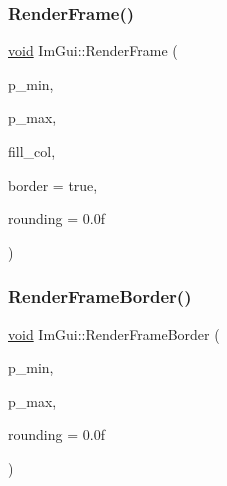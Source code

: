 \mbox{\label{namespaceImGui_a621ba649568ede3939d4f10d83b86d04}} 
\subsubsection{\texorpdfstring{Render\+Frame()}{RenderFrame()}}
{\footnotesize\ttfamily \hyperlink{imgui__impl__opengl3__loader_8h_ac668e7cffd9e2e9cfee428b9b2f34fa7}{void} Im\+Gui\+::\+Render\+Frame (\begin{DoxyParamCaption}\item[{\hyperlink{structImVec2}{Im\+Vec2}}]{p\+\_\+min,  }\item[{\hyperlink{structImVec2}{Im\+Vec2}}]{p\+\_\+max,  }\item[{Im\+U32}]{fill\+\_\+col,  }\item[{bool}]{border = {\ttfamily true},  }\item[{float}]{rounding = {\ttfamily 0.0f} }\end{DoxyParamCaption})}

\mbox{\label{namespaceImGui_adc76239c2006e66f8dab7638529a763d}} 
\subsubsection{\texorpdfstring{Render\+Frame\+Border()}{RenderFrameBorder()}}
{\footnotesize\ttfamily \hyperlink{imgui__impl__opengl3__loader_8h_ac668e7cffd9e2e9cfee428b9b2f34fa7}{void} Im\+Gui\+::\+Render\+Frame\+Border (\begin{DoxyParamCaption}\item[{\hyperlink{structImVec2}{Im\+Vec2}}]{p\+\_\+min,  }\item[{\hyperlink{structImVec2}{Im\+Vec2}}]{p\+\_\+max,  }\item[{float}]{rounding = {\ttfamily 0.0f} }\end{DoxyParamCaption})}

\mbox{\label{namespaceImGui_ade001ee6028075c9c1e2bd3f0395b920}} 
